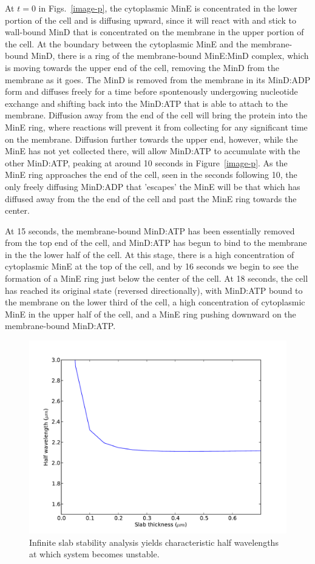 \documentclass[letterpaper,twocolumn,amsmath,amssymb,pre]{revtex4-1}
\begin{document}
At $t=0$ in Figs.~\ref{image-p}, the cytoplasmic MinE is concentrated
in the lower portion of the cell and is diffusing upward, since it
will react with and stick to wall-bound MinD that is concentrated on
the membrane in the upper portion of the cell.  At the boundary
between the cytoplasmic MinE and the membrane-bound MinD, there is a
ring of the membrane-bound MinE:MinD complex, which is moving towards
the upper end of the cell, removing the MinD from the membrane as it
goes.  The MinD is removed from the membrane in its MinD:ADP form and
diffuses freely for a time before spontenously undergowing nucleotide
exchange and shifting back into the MinD:ATP that is able to attach to
the membrane.  Diffusion away from the end of the cell will bring the
protein into the MinE ring, where reactions will prevent it from
collecting for any significant time on the membrane.  Diffusion
further towards the upper end, however, while the MinE has not yet
collected there, will allow MinD:ATP to accumulate with the other
MinD:ATP, peaking at around 10 seconds in Figure~\ref{image-p}.  As
the MinE ring approaches the end of the cell, seen in the seconds
following 10, the only freely diffusing MinD:ADP that 'escapes' the
MinE will be that which has diffused away from the the end of the cell
and past the MinE ring towards the center.

At 15 seconds, the membrane-bound MinD:ATP has been essentially
removed from the top end of the cell, and MinD:ATP has begun to bind
to the membrane in the the lower half of the cell.  At this stage,
there is a high concentration of cytoplasmic MinE at the top of the
cell, and by 16 seconds we begin to see the formation of a MinE ring
just below the center of the cell.  At 18 seconds, the cell has
reached its original state (reversed directionally), with MinD:ATP
bound to the membrane on the lower third of the cell, a high
concentration of cytoplasmic MinE in the upper half of the cell, and a
MinE ring pushing downward on the membrane-bound MinD:ATP.

\begin{figure}
  \includegraphics[width=\columnwidth]{stability-analysis}
  \caption{Infinite slab stability analysis yields characteristic half
    wavelengths at which system becomes unstable.}
    \label{fig:stability-analysis}
\end{figure}
\end{document}
